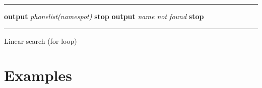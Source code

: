 \begin{algrthm}
\hrule\kern5pt\relax
\begin{algorithmic}[1]
  
     \State \textbf{output} \textit{phonelist(namespot)}
     \State \textbf{stop}
   \EndIf
 \EndFor
 \State \textbf{output} \textit{name not found}
 \State \textbf{stop}
\end{algorithmic}
\kern2pt\hrule\kern5pt\relax
\caption{Linear search (for loop)}\label{alg:lin srch for loop}
\end{algrthm}

\clearpage
\section{Examples}

